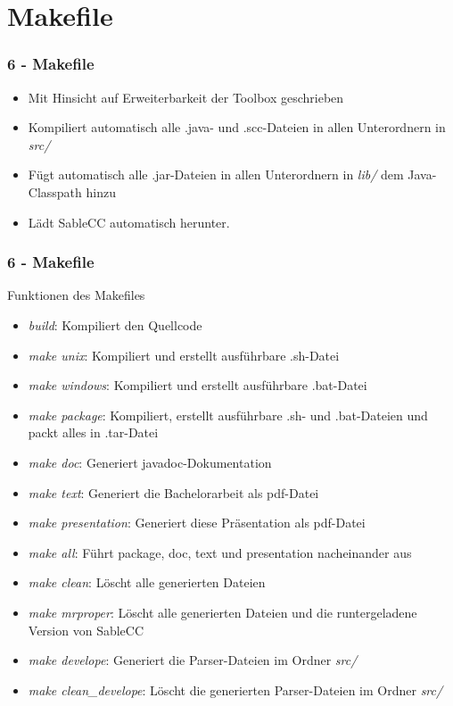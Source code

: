 \documentclass[9pt, xcolor={dvipsnames}]{beamer}
\begin{document}
\section{Makefile}
\begin{frame}[fragile]\frametitle{6 - Makefile}
	\begin{itemize}
		\item Mit Hinsicht auf Erweiterbarkeit der Toolbox geschrieben
		\item Kompiliert automatisch alle .java- und .scc-Dateien in allen Unterordnern in \textit{src/}
		\item Fügt automatisch alle .jar-Dateien in allen Unterordnern in \textit{lib/} dem Java-Classpath hinzu
		\item Lädt SableCC automatisch herunter.
	\end{itemize}
\end{frame}

\begin{frame}[fragile]\frametitle{6 - Makefile}
	{ \fontsize{12}{12} \selectfont Funktionen des Makefiles}
	\begin{itemize}
		\item \textit{build}: Kompiliert den Quellcode
		\item \textit{make unix}: Kompiliert und erstellt ausführbare .sh-Datei
		\item \textit{make windows}: Kompiliert und erstellt ausführbare .bat-Datei
		\item \textit{make package}: Kompiliert, erstellt ausführbare .sh- und .bat-Dateien und packt alles in .tar-Datei
		\pause
		\item \textit{make doc}: Generiert javadoc-Dokumentation
		\item \textit{make text}: Generiert die Bachelorarbeit als pdf-Datei
		\item \textit{make presentation}: Generiert diese Präsentation als pdf-Datei
		\pause
		\item \textit{make all}: Führt package, doc, text und presentation nacheinander aus
		\pause
		\item \textit{make clean}: Löscht alle generierten Dateien
		\item \textit{make mrproper}: Löscht alle generierten Dateien und die runtergeladene Version von SableCC
		\pause
		\item \textit{make develope}: Generiert die Parser-Dateien im Ordner \textit{src/}
		\item \textit{make clean\_develope}: Löscht die generierten Parser-Dateien im Ordner \textit{src/}
	\end{itemize}
\end{frame}
\end{document}
